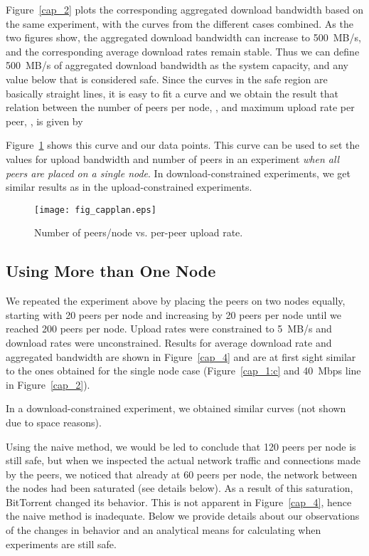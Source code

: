 \documentclass[10pt,letterpaper,twocolumn]{article}
\begin{document}
Figure~\ref{cap_2} plots the corresponding aggregated download
bandwidth based on the same experiment, with the curves from the
different cases combined. As the two figures show, the aggregated
download bandwidth can increase to 500~MB/s, and the corresponding
average download rates remain stable. Thus we can define 500~MB/s of
aggregated download bandwidth as the system capacity, and any value
below that is considered safe. Since the curves in the safe region are
basically straight lines, it is easy to fit a curve and we obtain the
result that relation between the number of peers per node, , and maximum
upload rate per peer, , is given by


Figure~\ref{cap_3} shows this curve and our data points. This curve
can be used to set the values for upload bandwidth and number of peers
in an experiment \textit{when all peers are placed on a single
  node}. In download-constrained experiments, we get similar results
as in the upload-constrained experiments.

\begin{figure}[!tb]
\begin{center}
\texttt{[image: fig\_capplan.eps]}
\caption{Number of peers/node vs. per-peer upload rate.}
\label{cap_3}
\end{center}
\end{figure}


\subsection{Using More than One Node}
\label{sec:using-more-than}

We repeated the experiment above by placing the peers on two nodes
equally, starting with 20 peers per node and increasing by 20 peers
per node until we reached 200 peers per node. Upload rates were
constrained to 5~MB/s and download rates were unconstrained. Results
for average download rate and aggregated bandwidth are shown in
Figure~\ref{cap_4} and are at first sight similar to the ones obtained
for the single node case (Figure~\ref{cap_1:c} and 40~Mbps line in
Figure~\ref{cap_2}). 

In a download-constrained experiment, we obtained similar curves (not
shown due to space reasons).

Using the naive method, we would be led to conclude that 120 peers per
node is still safe, but when we inspected the actual network traffic
and connections made by the peers, we noticed that already at 60 peers
per node, the network between the nodes had been saturated (see
details below). As a result of this saturation, BitTorrent changed its
behavior. This is not apparent in Figure~\ref{cap_4}, hence the naive
method is inadequate. Below we provide details about our observations
of the changes in behavior and an analytical means for calculating
when experiments are still safe.
\end{document}
